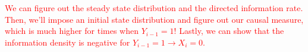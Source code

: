 \begin{example}
\textcolor{red}{We can figure out the steady state distribution and the directed information rate. Then, we'll impose an initial state distribution and figure out our causal measure, which is much higher for times when $Y_{i-1} = 1$! Lastly, we can show that the information density is negative for $Y_{i-1} = 1 \rightarrow X_i = 0$. }

\end{example}